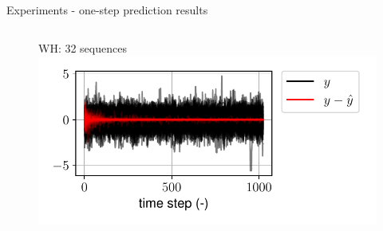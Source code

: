 \documentclass{beamer}
\begin{document}
\begin{frame}{Experiments - one-step prediction results}
\begin{columns}[t]
\begin{center}
\begin{figure}
WH: 32 sequences
\includegraphics[width=\textwidth]{fig/wh_one_step_batch.pdf} 
\end{figure}
\end{center}
\end{columns}
\end{frame}
\end{document}
